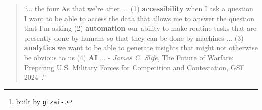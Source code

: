 \begin{quote}
\enquote{... the four As that we're after ... (1) \textbf{accessibility} when I ask a question I want to be able to access the data that allows me to answer the question that I'm asking (2) \textbf{automation} our ability to make routine tasks that are presently done by humans so that they can be done by machines ... (3) \textbf{analytics} we want to be able to generate insights that might not otherwise be obvious to us (4) \textbf{AI} ... - \emph{James C. Slife}, The Future of Warfare: Preparing U.S. Military Forces for Competition and Contestation, GSF 2024~\cite{Slife24}.}
\end{quote}


\begin{abstract}
First, we develop a mathematical model to discuss the four As in Section~\ref{theory}. Then, we propose expansions for Access and Automation in Sections~\ref{access} and \ref{automation}, respectively. We briefly review a proposed view of Analytics as Access to the outputs of Automation in Section~\ref{analytics}. Finally, in Section~\ref{ai}, we review a reference implementation of the proposed framework~\cite{abcli} based on \emph{Bash}~\cite{gnu_bash} expansions that call into \emph{Python}~\cite{python} in multiple AI applications~\footnote{built by \texttt{gizai-\revision}.}.
\end{abstract}


